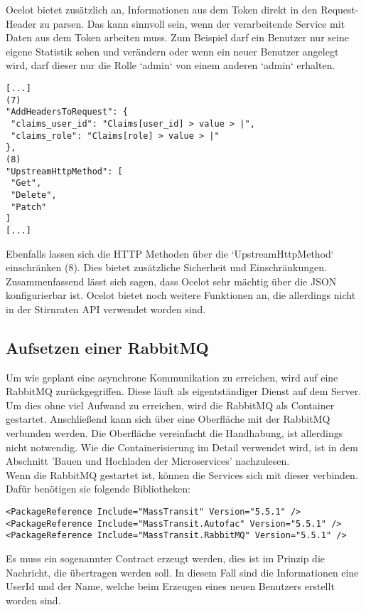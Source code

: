 Ocelot bietet zusätzlich an, Informationen aus dem Token direkt in den Request-Header zu parsen. Das kann sinnvoll sein, wenn der verarbeitende Service mit Daten aus dem Token arbeiten muss. Zum Beispiel darf ein Benutzer nur seine eigene Statistik sehen und verändern oder wenn ein neuer Benutzer angelegt wird, darf dieser nur die Rolle `admin` von einem anderen `admin` erhalten.  

\begin{verbatim}
[...]
(7)
"AddHeadersToRequest": {
 "claims_user_id": "Claims[user_id] > value > |",
 "claims_role": "Claims[role] > value > |"
},
(8)
"UpstreamHttpMethod": [
 "Get",
 "Delete",
 "Patch"
]
[...]
\end{verbatim}

Ebenfalls lassen sich die HTTP Methoden über die `UpstreamHttpMethod` einschränken (8). Dies bietet zusätzliche Sicherheit und Einschränkungen. \\

Zusammenfassend lässt sich sagen, dass Ocelot sehr mächtig über die JSON konfigurierbar ist. Ocelot bietet noch weitere Funktionen an, die allerdings nicht in der Stirnraten API verwendet worden sind.  

\subsection{Aufsetzen einer RabbitMQ}

Um wie geplant eine asynchrone Kommunikation zu erreichen, wird auf eine RabbitMQ zurückgegriffen. Diese läuft als eigentständiger Dienst auf dem Server. Um dies ohne viel Aufwand zu erreichen, wird die RabbitMQ als Container gestartet. Anschließend kann sich über eine Oberfläche mit der RabbitMQ verbunden werden. Die Oberfläche vereinfacht die Handhabung, ist allerdings nicht notwendig. Wie die Containerisierung im Detail verwendet wird, ist in dem Abschnitt 'Bauen und Hochladen der Microservices' nachzulesen.\\

Wenn die RabbitMQ gestartet ist, können die Services sich mit dieser verbinden. Dafür benötigen sie folgende Bibliotheken:

\begin{verbatim}
<PackageReference Include="MassTransit" Version="5.5.1" />
<PackageReference Include="MassTransit.Autofac" Version="5.5.1" />
<PackageReference Include="MassTransit.RabbitMQ" Version="5.5.1" />
\end{verbatim}

Es muss ein sogenannter Contract erzeugt werden, dies ist im Prinzip die Nachricht, die übertragen werden soll. In diesem Fall sind die Informationen eine UserId und der Name, welche beim Erzeugen eines neuen Benutzers erstellt worden sind.


